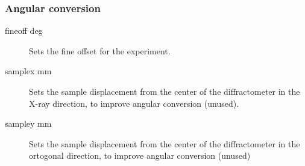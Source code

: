 \documentclass{article}
\begin{document}
\subsubsection{Angular conversion}

\begin{description}
\item[fineoff deg] Sets the fine offset for the experiment.
\item[samplex mm] Sets the sample displacement from the center of the diffractometer in the X-ray direction, to improve angular conversion (unused).
\item[sampley mm] Sets the sample displacement from the center of the diffractometer in the ortogonal direction, to improve angular conversion (unused)
\end{description}
\end{document}
